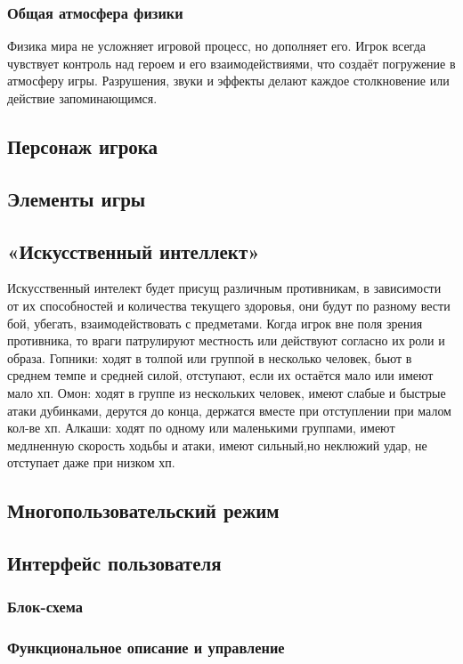 \documentclass[12pt]{article}
\begin{document}
        
        \subsubsection{Общая атмосфера физики}
        
        Физика мира не усложняет игровой процесс, но дополняет его. Игрок всегда чувствует контроль над героем и его взаимодействиями, что создаёт погружение в атмосферу игры. Разрушения, звуки и эффекты делают каждое столкновение или действие запоминающимся.

    \subsection{Персонаж игрока}
    \subsection{Элементы игры}
    \subsection{«Искусственный интеллект»}
            Искусственный интелект будет присущ различным противникам, в зависимости от их способностей и количества текущего здоровья, они будут по разному вести бой, убегать, взаимодействовать с предметами. Когда игрок вне поля зрения противника, то враги патрулируют местность или действуют согласно их роли и образа. Гопники: ходят в толпой или группой в несколько человек, бьют в среднем темпе и средней силой, отступают, если их остаётся мало или имеют мало хп. Омон: ходят в группе из нескольких человек, имеют слабые и быстрые атаки дубинками, дерутся до конца, держатся вместе при отступлении при малом кол-ве хп. Алкаши: ходят по одному или маленькими группами, имеют медлненную скорость ходьбы и атаки, имеют сильный,но неклюжий удар, не отступает даже при низком хп. 
    \subsection{Многопользовательский режим}
    \subsection{Интерфейс пользователя}
        \subsubsection{Блок-схема}
        \subsubsection{Функциональное описание и управление}
\end{document}
